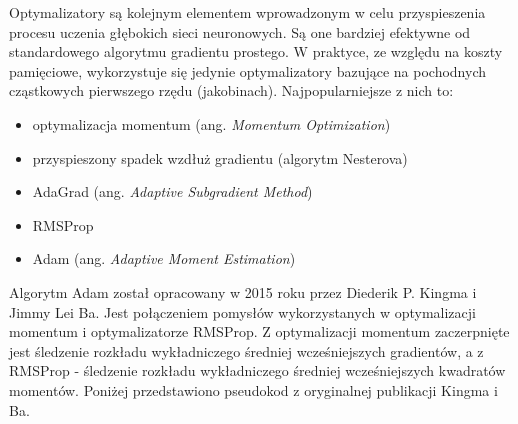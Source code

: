 \documentclass[a4paper,11pt]{article}
\begin{document}
    Optymalizatory są kolejnym elementem wprowadzonym w celu przyspieszenia procesu uczenia głębokich sieci neuronowych. Są one bardziej efektywne od standardowego algorytmu gradientu prostego. W praktyce, ze względu na koszty pamięciowe, wykorzystuje się jedynie optymalizatory bazujące na pochodnych cząstkowych pierwszego rzędu (jakobinach)\cite{UczenieMaszynowe2018}. Najpopularniejsze z nich to:
    \begin{itemize}
        \item optymalizacja momentum (ang. \textit{Momentum Optimization})
        \item przyspieszony spadek wzdłuż gradientu (algorytm Nesterova)
        \item AdaGrad (ang. \textit{Adaptive Subgradient Method})
        \item RMSProp
        \item Adam (ang. \textit{Adaptive Moment Estimation})
    \end{itemize}

    \bigskip

    Algorytm Adam został opracowany w 2015 roku przez Diederik P. Kingma i Jimmy Lei Ba\cite{AdamOptimization2015}. Jest połączeniem pomysłów wykorzystanych w optymalizacji momentum i optymalizatorze RMSProp. Z optymalizacji momentum zaczerpnięte jest śledzenie rozkładu wykładniczego średniej wcześniejszych gradientów, a z RMSProp - śledzenie rozkładu wykładniczego średniej wcześniejszych kwadratów momentów\cite{UczenieMaszynowe2018}. Poniżej przedstawiono pseudokod z oryginalnej publikacji Kingma i Ba.

    \bigskip
\end{document}
